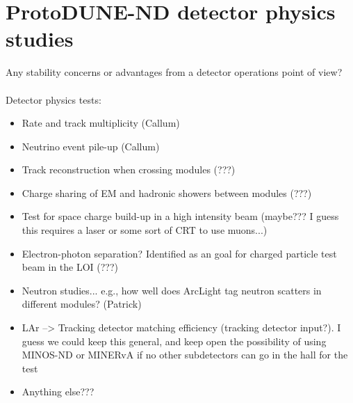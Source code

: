 \section{ProtoDUNE-ND detector physics studies}
\label{sec:detector-physics-studies}

Any stability concerns or advantages from a detector operations point of view?\\\\ 

Detector physics tests:
\begin{itemize}
\item Rate and track multiplicity (Callum)
\item Neutrino event pile-up (Callum)
\item Track reconstruction when crossing modules (???)
\item Charge sharing of EM and hadronic showers between modules (???)
\item Test for space charge build-up in a high intensity beam (maybe??? I guess this requires a laser or some sort of CRT to use muons...)
\item Electron-photon separation? Identified as an goal for charged particle test beam in the LOI (???)
\item Neutron studies... e.g., how well does ArcLight tag neutron scatters in different modules? (Patrick)
\item LAr --> Tracking detector matching efficiency (tracking detector input?). I guess we could keep this general, and keep open the possibility of using MINOS-ND or MINERvA if no other subdetectors can go in the hall for the test
\item Anything else???
\end{itemize}
